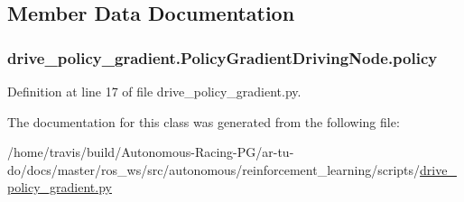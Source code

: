 \subsection{Member Data Documentation}
\subsubsection[{\texorpdfstring{policy}{policy}}]{\setlength{\rightskip}{0pt plus 5cm}drive\+\_\+policy\+\_\+gradient.\+Policy\+Gradient\+Driving\+Node.\+policy}\hypertarget{classdrive__policy__gradient_1_1_policy_gradient_driving_node_aeae8c97ac1c16ca68d20a8499f9b4734}{}\label{classdrive__policy__gradient_1_1_policy_gradient_driving_node_aeae8c97ac1c16ca68d20a8499f9b4734}


Definition at line 17 of file drive\+\_\+policy\+\_\+gradient.\+py.



The documentation for this class was generated from the following file\+:\begin{DoxyCompactItemize}
\item 
/home/travis/build/\+Autonomous-\/\+Racing-\/\+P\+G/ar-\/tu-\/do/docs/master/ros\+\_\+ws/src/autonomous/reinforcement\+\_\+learning/scripts/\hyperlink{drive__policy__gradient_8py}{drive\+\_\+policy\+\_\+gradient.\+py}\end{DoxyCompactItemize}
